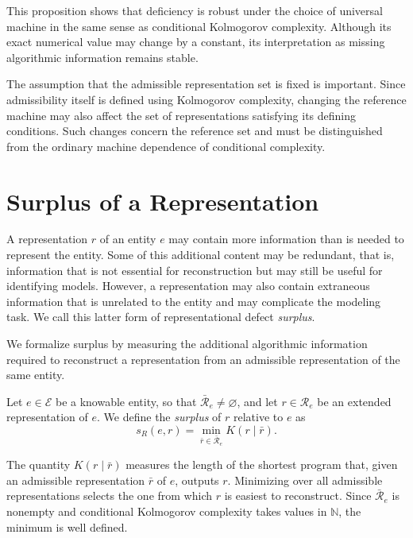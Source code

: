 This proposition shows that deficiency is robust under the choice of universal machine in the same sense as conditional Kolmogorov complexity. Although its exact numerical value may change by a constant, its interpretation as missing algorithmic information remains stable.

The assumption that the admissible representation set is fixed is important. Since admissibility itself is defined using Kolmogorov complexity, changing the reference machine may also affect the set of representations satisfying its defining conditions. Such changes concern the reference set and must be distinguished from the ordinary machine dependence of conditional complexity.

%
%

\section{Surplus of a Representation}
\label{sec:surplus}

A representation $r$ of an entity $e$ may contain more information than is needed to represent the entity. Some of this additional content may be redundant, that is, information that is not essential for reconstruction but may still be useful for identifying models. However, a representation may also contain extraneous information that is unrelated to the entity and may complicate the modeling task. We call this latter form of representational defect \emph{surplus}.

We formalize surplus by measuring the additional algorithmic information required to reconstruct a representation from an admissible representation of the same entity.

\begin{definition}
\label{def:surplus}
Let $e\in\mathcal E$ be a knowable entity, so that $\bar{\mathcal R}_e\neq\varnothing$, and let $r\in\mathcal R_e$ be an extended representation of $e$. We define the \emph{surplus} of $r$ relative to $e$ as
\[
s_R(e,r) = \min_{\bar r\in\bar{\mathcal R}_e}K(r\mid\bar r).
\]
\end{definition}

The quantity $K(r\mid\bar r)$ measures the length of the shortest program that, given an admissible representation $\bar r$ of $e$, outputs $r$. Minimizing over all admissible representations selects the one from which $r$ is easiest to reconstruct. Since $\bar{\mathcal R}_e$ is nonempty and conditional Kolmogorov complexity takes values in $\mathbb N$, the minimum is well defined.

